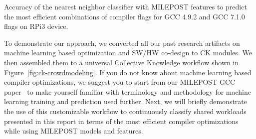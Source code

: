   \begin{table}[!htbp]
    \centering
    \caption{
     Accuracy of the nearest neighbor classifier with MILEPOST features 
     to predict the most efficient combinations of compiler flags 
     for GCC 4.9.2 and GCC 7.1.0 flags on RPi3 device.
    }
    \label{fig:crowdmodeling-milepost-all-rpi3-progs}
  \end{table}

To demonstrate our approach, we converted all our past research artifacts 
on machine learning based optimization and SW/HW co-design
to CK modules.
%
We then assembled them to a universal Collective Knowledge workflow 
shown in Figure~\ref{fig:ck-crowdmodeling}.
%
If you do not know about machine learning based compiler optimizations, 
we suggest you to start from our MILEPOST GCC paper~\cite{29db2248aba45e59:a31e374796869125}
to make yourself familiar with terminology 
and methodology for machine learning training 
and prediction used further.
%
Next, we will briefly demonstrate the use of this customizable workflow 
to continuously classify shared workloads presented in this report 
in terms of the most efficient compiler optimizations
while using MILEPOST models and features.

